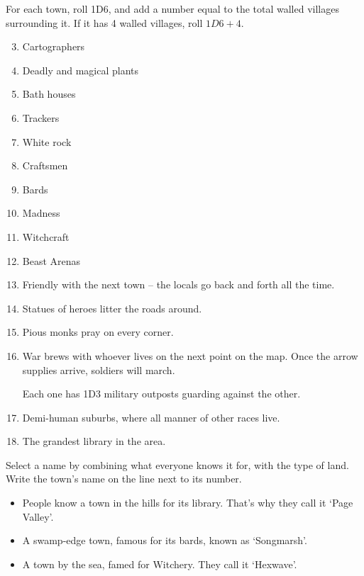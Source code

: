 \begin{multicols}{2}
For each town, roll 1D6, and add a number equal to the total walled villages surrounding it.
If it has 4 walled villages, roll $1D6+4$.

\begin{multicols}{2}

\begin{enumerate}
\setcounter{enumi}{2}
\item
  Cartographers
\item
  Deadly and magical plants
\item
  Bath houses
\item
  Trackers
\item
  White rock
\item
  Craftsmen
\item
  Bards
\item
  Madness
\item
  Witchcraft
\item
  Beast Arenas
\item
  Friendly with the next town -- the locals go back and forth all the
  time.
\item
  Statues of heroes litter the roads around.
\item
  Pious monks pray on every corner.
\item
  War brews with whoever lives on the next point on the map. Once the
  arrow supplies arrive, soldiers will march.

  Each one has 1D3 military outposts guarding against the other.
\item
  Demi-human suburbs, where all manner of other races live.
\item
  The grandest library in the area.
\end{enumerate}

\end{multicols}


Select a name by combining what everyone knows it for, with the type of
land.
Write the town's name on the line next to its number.

\begin{itemize}
\item
  People know a town in the hills for its library. That's why they call
  it `Page Valley'.
\item
  A swamp-edge town, famous for its bards, known as `Songmarsh'.
\item
  A town by the sea, famed for Witchery. They call it `Hexwave'.
\end{itemize}


\end{multicols}
